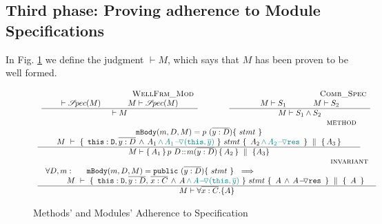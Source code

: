 \subsection{Third phase: Proving adherence to Module Specifications}
\label{sect:wf}

In Fig. \ref{f:wf} we  define the judgment $\vdash M$, which says that  
$M$ has been proven to be well formed. 
 

\begin{figure}[thb]
$
\begin{array}{l}
\begin{array}{lcl}
\inferruleSDNarrow 
{~ \strut  {\sc{WellFrm\_Mod}}}
{  \vdash \SpecOf {M}
  \hspace{1.2cm}  M \vdash \SpecOf {M}
}
{
\vdash M  
}
& \hspace{0.7cm} &
\inferruleSDNarrow 
{~ \strut   {\sc{Comb\_Spec}}}
{  
M \vdash S_1 \hspace{1.2cm}  M \vdash S_2
}
{
M \vdash S_1 \wedge S_2
}
\end{array}
\\
\inferruleSD 
{~ \strut \hspace{6.5cm} {\sc{method}}}
{  
 \prg{mBody}(m,D,M)=p \ (\overline{y:D})\{\  stmt \ \}       
    \\
  {\hprovesN{M} { \ \prg{this}:\prg{D}, \overline{y:D}\, \wedge\, A_1\, \sdN{\wedge\, \PushASLong {(\prg{this},\overline y)}  {A_1}}\, } {\ stmt\ } {\ A_2\, \sdN{\wedge\, \PushASLong {\prg{res}} {A_2}} \ }   {A_3} } 
}
{
M \vdash {\mprepostN {A_1}{p\ D}{m}{y}{D}{A_2} {A_3} }
}
\\
\inferruleSD 
{~ \strut \hspace{6.5cm} {\sc{invariant}}}
{
\begin{array}{l}
\forall  D,  m:\ \ \  \ \  \prg{mBody}(m,D,M)=\prg{public} \ (\overline{y:D})\{\  stmt \ \}      \ \ \Longrightarrow  
  \\
   ~ \strut \hspace{0.3cm}  \ \ \ 
 \begin{array}{l}
   \hprovesN {M}  
{ \ \prg{this}:\prg{D}, \overline{y:D},\,   \overline{x:C} \, \wedge\,  A \, \sdN{\wedge\, \PushASLong {(\prg{this},\overline y)} {A}}\, }  
  	{\ stmt\ }   
	 {\  A\, \wedge\, \PushASLong {\prg{res}} {A} \ }  
{\ A \ }
 \end{array}
 \end{array}
}
{
M \vdash \TwoStatesN{ \overline{x:C}} {A}
}
\end{array}
$
\caption{Methods' and Modules' Adherence to Specification}
\label{f:wf}
\end{figure}

